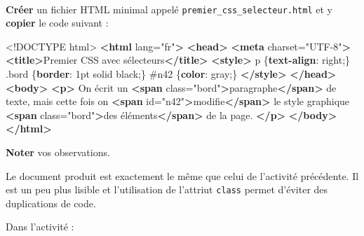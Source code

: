 \documentclass[a4paper,17pt]{extarticle}
\newenvironment{eleve}%
{\begin{activite}\color{noiramu}\\}
{\end{activite}}
\newenvironment{Shaded}{}{}
\newcommand{\KeywordTok}[1]{\textcolor[rgb]{0.00,0.44,0.13}{\textbf{{#1}}}}
\newcommand{\DataTypeTok}[1]{\textcolor[rgb]{0.56,0.13,0.00}{{#1}}}
\newcommand{\DecValTok}[1]{\textcolor[rgb]{0.25,0.63,0.44}{{#1}}}
\newcommand{\StringTok}[1]{\textcolor[rgb]{0.25,0.44,0.63}{{#1}}}
\newcommand{\OtherTok}[1]{\textcolor[rgb]{0.00,0.44,0.13}{{#1}}}
\newcommand{\FunctionTok}[1]{\textcolor[rgb]{0.02,0.16,0.49}{{#1}}}
\newcommand{\NormalTok}[1]{{#1}}
\newcommand{\ConstantTok}[1]{\textcolor[rgb]{0.53,0.00,0.00}{{#1}}}
\newcommand{\OperatorTok}[1]{\textcolor[rgb]{0.40,0.40,0.40}{{#1}}}
\newcommand{\PreprocessorTok}[1]{\textcolor[rgb]{0.74,0.48,0.00}{{#1}}}
\begin{document}
\begin{eleve}
    \textbf{Créer} un fichier HTML minimal appelé
\texttt{premier\_css\_selecteur.html} et y \textbf{copier} le code
suivant :

\begin{Shaded}
\begin{Highlighting}[]
\DataTypeTok{\textless{}!DOCTYPE }\NormalTok{html}\DataTypeTok{\textgreater{}}
\KeywordTok{\textless{}html}\OtherTok{ lang=}\StringTok{"fr"}\KeywordTok{\textgreater{}}
\KeywordTok{\textless{}head\textgreater{}}
    \KeywordTok{\textless{}meta}\OtherTok{ charset=}\StringTok{"UTF{-}8"}\KeywordTok{\textgreater{}}
    \KeywordTok{\textless{}title\textgreater{}}\NormalTok{Premier CSS avec sélecteurs}\KeywordTok{\textless{}/title\textgreater{}}
    \KeywordTok{\textless{}style\textgreater{}}
\NormalTok{        p \{}\KeywordTok{text{-}align}\NormalTok{: }\DecValTok{right}\OperatorTok{;}\NormalTok{\}}
        \FunctionTok{.bord}\NormalTok{ \{}\KeywordTok{border}\NormalTok{: }\DecValTok{1}\DataTypeTok{pt} \DecValTok{solid} \ConstantTok{black}\OperatorTok{;}\NormalTok{\}}
        \PreprocessorTok{\#n42}\NormalTok{ \{}\KeywordTok{color}\NormalTok{: }\ConstantTok{gray}\OperatorTok{;}\NormalTok{\}}
    \KeywordTok{\textless{}/style\textgreater{}}
\KeywordTok{\textless{}/head\textgreater{}}
\KeywordTok{\textless{}body\textgreater{}}
    \KeywordTok{\textless{}p\textgreater{}}
\NormalTok{        On écrit un }
        \KeywordTok{\textless{}span}\OtherTok{ class=}\StringTok{"bord"}\KeywordTok{\textgreater{}}\NormalTok{paragraphe}\KeywordTok{\textless{}/span\textgreater{}}
\NormalTok{        de texte, mais cette fois on }
        \KeywordTok{\textless{}span}\OtherTok{ id=}\StringTok{"n42"}\KeywordTok{\textgreater{}}\NormalTok{modifie}\KeywordTok{\textless{}/span\textgreater{}}
\NormalTok{        le style graphique }
        \KeywordTok{\textless{}span}\OtherTok{ class=}\StringTok{"bord"}\KeywordTok{\textgreater{}}\NormalTok{des éléments}\KeywordTok{\textless{}/span\textgreater{}}
\NormalTok{        de la page.}
    \KeywordTok{\textless{}/p\textgreater{}}
\KeywordTok{\textless{}/body\textgreater{}}
\KeywordTok{\textless{}/html\textgreater{}}
\end{Highlighting}
\end{Shaded}

\textbf{Noter} vos observations.
        
        \end{eleve}\begin{reponse}
    Le document produit est exactement le même que celui de l'activité
précédente. Il est un peu plus lisible et l'utilisation de l'attriut
\texttt{class} permet d'éviter des duplications de code.

            \end{reponse}
    Dans l'activité :
\end{document}
